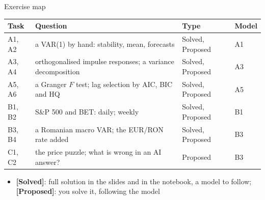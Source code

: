 \begin{frame}{Exercise map}
\itemsize{\small}
\begin{center}
\footnotesize
\begin{tabular}{>{\raggedright\arraybackslash}p{1.1cm}>{\raggedright\arraybackslash}p{7.5cm}>{\raggedright\arraybackslash}p{1.9cm}>{\raggedright\arraybackslash}p{1.4cm}}
\toprule
\textbf{Task} & \textbf{Question} & \textbf{Type} & \textbf{Model} \\
\midrule
A1, A2 & a VAR(1) by hand: stability, mean, forecasts & Solved, Proposed & A1 \\
A3, A4 & orthogonalised impulse responses; a variance decomposition & Solved, Proposed & A3 \\
A5, A6 & a Granger $F$ test; lag selection by AIC, BIC and HQ & Solved, Proposed & A5 \\
B1, B2 & S\&P 500 and BET: daily; weekly & Solved, Proposed & B1 \\
B3, B4 & a Romanian macro VAR; the EUR/RON rate added & Solved, Proposed & B3 \\
C1, C2 & the price puzzle; what is wrong in an AI answer? & Proposed & B3 \\
\bottomrule
\end{tabular}
\end{center}
\begin{itemize}
    \item \textbf{[Solved]}: full solution in the slides and in the notebook, a model to follow; \textbf{[Proposed]}: you solve it, following the model
\end{itemize}
\end{frame}

